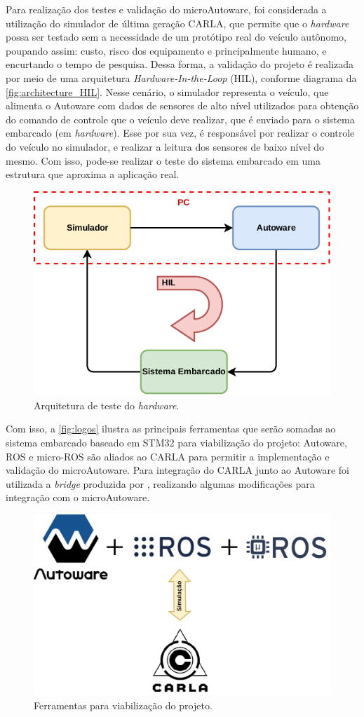 Para realização dos testes e validação do microAutoware, foi considerada a utilização do simulador de última geração CARLA\cite{carla}, que permite que o \textit{hardware} possa ser testado sem a necessidade de um protótipo real do veículo autônomo, poupando assim: custo, risco dos equipamento e principalmente humano, e encurtando o tempo de pesquisa. Dessa forma, a validação do projeto é realizada por meio de uma arquitetura \textit{Hardware-In-the-Loop} (HIL), conforme diagrama da \autoref{fig:architecture_HIL}. Nesse cenário, o simulador representa o veículo, que alimenta o Autoware com dados de sensores de alto nível utilizados para obtenção do comando de controle que o veículo deve realizar, que é enviado para o sistema embarcado (em \textit{hardware}). Esse por sua vez, é responsável por realizar o controle do veículo no simulador, e realizar a leitura dos sensores de baixo nível do mesmo. Com isso, pode-se realizar o teste do sistema embarcado em uma estrutura que aproxima a aplicação real.

\begin{figure}[H]
	\centering
	\includegraphics[width=0.55\linewidth]{img/architecture_HIL}
	\caption{Arquitetura de teste do \textit{hardware}.}
	\label{fig:architecture_HIL}
\end{figure}

Com isso, a \autoref{fig:logos} ilustra as principais ferramentas que serão somadas ao sistema embarcado baseado em STM32 para viabilização do projeto: Autoware, ROS e micro-ROS são aliados ao CARLA para permitir a implementação e validação do microAutoware. Para integração do CARLA junto ao Autoware foi utilizada a \textit{bridge} produzida por , realizando algumas modificações para integração com o microAutoware.

\begin{figure}[H]
	\centering
	\includegraphics[width=0.75\linewidth]{img/logos}
	\caption{Ferramentas para viabilização do projeto.}
	\label{fig:logos}
\end{figure}

